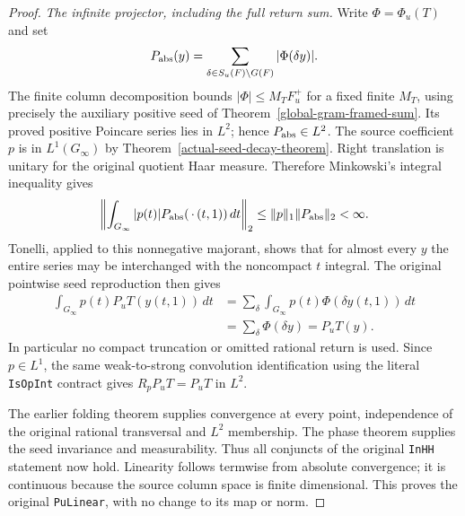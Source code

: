 \begin{proof}
\emph{The infinite projector, including the full return sum.}
Write $\Phi=\Phi_u(T)$ and set
\[
 P_{\rm abs}(y)=\sum_{\delta\in S_u(F)\backslash G(F)}
                                    |\Phi(\delta y)|.
\]
The finite column decomposition bounds
$|\Phi|\le M_TF_u^+$ for a fixed finite $M_T$, using precisely
the auxiliary positive seed of
Theorem~\ref{global-gram-framed-sum}.  Its proved positive
Poincare series lies in $L^2$; hence $P_{\rm abs}\in L^2$.
The source coefficient $p$ is in $L^1(G_\infty)$ by
Theorem~\ref{actual-seed-decay-theorem}.  Right translation
is unitary for the original quotient Haar measure.  Therefore
Minkowski's integral inequality gives
\begin{equation}\label{global-gram-convolution-majorant}
 \left\|\int_{G_\infty}|p(t)|P_{\rm abs}(\,\cdot\,(t,1))\,dt
                                                     \right\|_2
       \le\|p\|_1\|P_{\rm abs}\|_2<\infty.
\end{equation}
Tonelli, applied to this nonnegative majorant, shows that for
almost every $y$ the entire series may be interchanged with
the noncompact $t$ integral.  The original pointwise seed
reproduction then gives
\begin{align*}
 \int_{G_\infty}p(t)P_uT(y(t,1))\,dt
 &=\sum_\delta\int_{G_\infty}p(t)\Phi(\delta y(t,1))\,dt\\
 &=\sum_\delta\Phi(\delta y)=P_uT(y).
\end{align*}
In particular no compact truncation or omitted rational return
is used.  Since $p\in L^1$, the same weak-to-strong convolution
identification using the literal \texttt{IsOpInt} contract
gives $R_pP_uT=P_uT$ in $L^2$.

The earlier folding theorem supplies convergence at every point,
independence of the original rational transversal and $L^2$
membership.  The phase theorem supplies the seed invariance
and measurability.  Thus all conjuncts of the original
\texttt{InHH} statement now hold.  Linearity follows termwise
from absolute convergence; it is continuous because the source
column space is finite dimensional.  This proves the original
\texttt{PuLinear}, with no change to its map or norm.
\end{proof}

